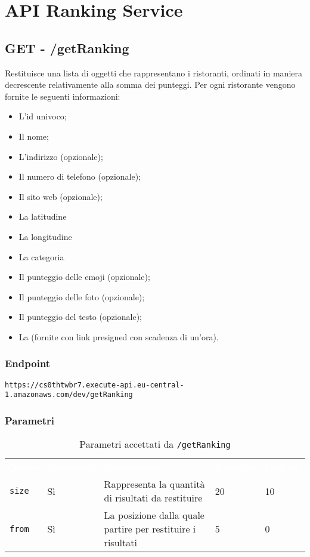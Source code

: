 
\section{API Ranking Service}



\subsection{GET - /getRanking}
Restituisce una lista di oggetti che rappresentano i ristoranti, ordinati in maniera decrescente relativamente alla somma dei punteggi. Per ogni ristorante vengono fornite le seguenti informazioni:
\begin{itemize}
	\item L'id univoco;
    \item Il nome;
    \item L'indirizzo (opzionale);
    \item Il numero di telefono (opzionale);
    \item Il sito web (opzionale);
    \item La latitudine
    \item La longitudine
    \item La categoria 
    \item Il punteggio delle emoji (opzionale);
    \item Il punteggio delle foto (opzionale);
    \item Il punteggio del testo (opzionale);
	\item La  (fornite con link presigned con scadenza di un'ora).
\end{itemize}

\subsubsection{Endpoint}
\texttt{https://cs0thtwbr7.execute-api.eu-central-1.amazonaws.com/dev/getRanking}

\subsubsection{Parametri}
\begin{table}[!htbp]
\renewcommand{\arraystretch}{1.5}

\begin{tabular}[t]{ m{}<{\centering}  m{}<{\centering} m{}<{\centering} m{}<{\centering}  m{}<{\centering} }
	\rowcolor{darkblue}
	\textcolor{white}{\textbf{Nome}} &\textcolor{white}{\textbf{Opzionale}} &\textcolor{white}{\textbf{Descrizione}} &\textcolor{white}{\textbf{Esempio}} &\textcolor{white}{\textbf{Default}} \\ 
\texttt{size} & Sì & Rappresenta la quantità di risultati da restituire & 20 & 10 \\
\texttt{from} & Sì & La posizione dalla quale partire per restituire i risultati & 5 & 0 \\


\end{tabular}


\caption{Parametri accettati da \texttt{/getRanking}}
\end{table}
\pagebreak

